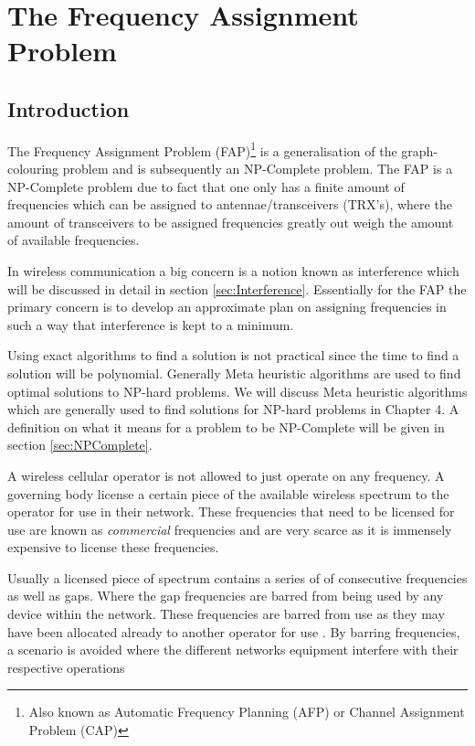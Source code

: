 \chapter{The Frequency Assignment Problem}
\label{chpt:fap}
\section{Introduction}
The Frequency Assignment Problem (FAP)\footnote{Also known as Automatic Frequency Planning (AFP) or Channel Assignment Problem (CAP)\cite{ACOvsEA}} is a generalisation of the graph-colouring problem and is subsequently an NP-Complete problem\cite{FAPRAMColouring}. The FAP is a NP-Complete problem due to fact that one only has a finite amount of frequencies which can be assigned to antennae/transceivers (TRX's), where the amount of transceivers to be assigned frequencies greatly out weigh the amount of available frequencies\cite{FAPRAMColouring}.

In wireless communication a big concern is a notion known as interference which will be discussed in detail in section \ref{sec:Interference}. Essentially for the FAP the primary concern is to develop an approximate plan on assigning frequencies in such a way that interference is kept to a minimum. 

Using exact algorithms to find a solution is not practical since the time to find a solution will be polynomial. Generally Meta heuristic algorithms are used to find optimal solutions to NP-hard problems\cite{ACOvsEA}. We will discuss Meta heuristic algorithms which are generally used to find solutions for NP-hard problems in Chapter 4. A definition on what it means for a problem to be NP-Complete will be given in section \ref{sec:NPComplete}. 

A wireless cellular operator is not allowed to just operate on any frequency. A governing body license a certain piece of the available wireless spectrum to the operator for use in their network\cite{FAPRAMColouring}. These frequencies that need to be licensed for use are known as \emph{commercial} frequencies and are very scarce as it is immensely expensive to license these frequencies\cite{FAPRAMColouring}. 

Usually a licensed piece of spectrum contains a series of of consecutive frequencies as well as gaps. Where the gap frequencies are barred from being used by any device within the network. These frequencies are barred from use as they may have been allocated already to another operator for use \cite{FAPInCell}. By barring frequencies, a scenario is avoided where the different networks equipment interfere with their respective operations \cite{FAPInCell}

